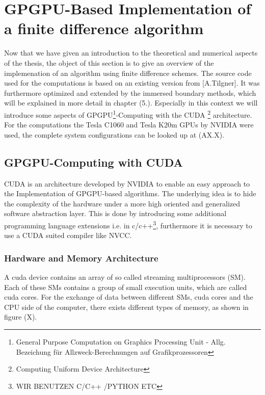 \chapter{GPGPU-Based Implementation of a finite difference algorithm}


Now that we have given an introduction to the theoretical and numerical aspects of the thesis,
the object of this section is to give an overview of the implemenation of an algorithm using finite difference schemes.
The source code used for the computations is based on an existing version from [A.Tilgner].
It was furthermore optimized  and extended by the immersed boundary methods, which will be explained in more detail in chapter (5.).
Especially in this context we will introduce some aspects of GPGPU\footnote{General Purpose Computation on Graphics Processing Unit - Allg.  Bezeichung für Allzweck-Berechnungen auf Grafikprozessoren}-Computing
with the CUDA \footnote{Computing Uniform Device Architecture} architecture.
For the computations the  Tesla C1060 and Tesla K20m GPUs by NVIDIA were used, the complete system configurations can be looked up at (AX.X).

\section{GPGPU-Computing with CUDA}

CUDA is an architecture developed by NVIDIA to enable an easy approach to the Implementation of GPGPU-based algorithms.
The underlying idea is to hide the complexity of the hardware under a more high oriented and generalized software abstraction layer.
This is done by introducing some additional programming language extensions i.e. in c/c++\footnote{WIR BENUTZEN C/C++ /PYTHON ETC},
furthermore it is necessary to use a CUDA suited compiler like NVCC.

\subsection{Hardware and Memory Architecture}

A cuda device contains an array of so called streaming multiprocessors (SM).
Each of these SMs contains a group of small execution units, which are called cuda cores.
For the exchange of data between different SMs, cuda cores and the CPU side of the computer, there exists different
types of memory, as shown  in figure (X).
\newpage

